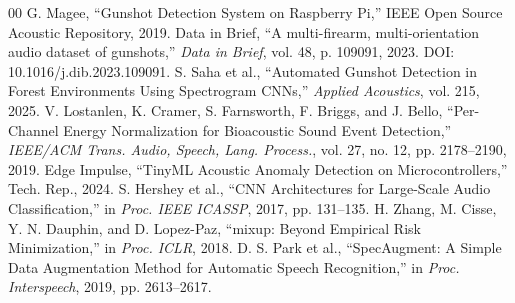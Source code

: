 \documentclass[conference]{IEEEtran}
\begin{document}
\begin{thebibliography}{00}
 G. Magee, ``Gunshot Detection System on Raspberry Pi,'' IEEE Open Source Acoustic Repository, 2019.
 Data in Brief, ``A multi-firearm, multi-orientation audio dataset of gunshots,'' \textit{Data in Brief}, vol. 48, p. 109091, 2023. DOI: 10.1016/j.dib.2023.109091.
 S. Saha et al., ``Automated Gunshot Detection in Forest Environments Using Spectrogram CNNs,'' \textit{Applied Acoustics}, vol. 215, 2025.
 V. Lostanlen, K. Cramer, S. Farnsworth, F. Briggs, and J. Bello, ``Per-Channel Energy Normalization for Bioacoustic Sound Event Detection,'' \textit{IEEE/ACM Trans. Audio, Speech, Lang. Process.}, vol. 27, no. 12, pp. 2178--2190, 2019.
 Edge Impulse, ``TinyML Acoustic Anomaly Detection on Microcontrollers,'' Tech. Rep., 2024.
 S. Hershey et al., ``CNN Architectures for Large-Scale Audio Classification,'' in \textit{Proc. IEEE ICASSP}, 2017, pp. 131--135.
 H. Zhang, M. Cisse, Y. N. Dauphin, and D. Lopez-Paz, ``mixup: Beyond Empirical Risk Minimization,'' in \textit{Proc. ICLR}, 2018.
 D. S. Park et al., ``SpecAugment: A Simple Data Augmentation Method for Automatic Speech Recognition,'' in \textit{Proc. Interspeech}, 2019, pp. 2613--2617.
\end{thebibliography}
\end{document}
